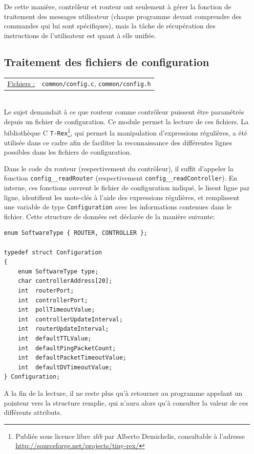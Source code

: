 \documentclass[a4paper,11pt]{article}
\begin{document}
De cette manière, contrôleur et routeur ont seulement à gérer la fonction de traitement des messages utilisateur (chaque programme devant comprendre des commandes qui lui sont spécifiques), mais la tâche de récupération des instructions de l'utilisateur est quant à elle unifiée.

\subsection{Traitement des fichiers de configuration}

\begin{tabularx}{\linewidth}{lX}
\underline{Fichiers :} & \texttt{common/config.c}, \texttt{common/config.h}\\
\end{tabularx}\\

Le sujet demandait à ce que routeur comme contrôleur puissent être paramétrés depuis un fichier de configuration. Ce module permet la lecture de ces fichiers. La bibliothèque C \texttt{T-Rex}\footnote{Publiée sous licence libre \textit{zlib} par Alberto Demichelis, consultable à l'adresse \url{http://sourceforge.net/projects/tiny-rex/}}, qui permet la manipulation d'expressions régulières, a été utilisée dans ce cadre afin de faciliter la reconnaissance des différentes lignes possibles dans les fichiers de configuration.

Dans le code du routeur (respectivement du contrôleur), il suffit d'appeler la fonction \texttt{config\_\_readRouter} (respectivement \texttt{config\_\_readController}). En interne, ces fonctions ouvrent le fichier de configuration indiqué, le lisent ligne par ligne, identifient les mots-clés à l'aide des expressions régulières, et remplissent une variable de type \texttt{Configuration} avec les informations contenues dans le fichier. Cette structure de données est déclarée de la manière suivante:

\begin{lstlisting}
enum SoftwareType { ROUTER, CONTROLLER };

typedef struct Configuration
{
	enum SoftwareType type;
	char controllerAddress[20];
	int  routerPort;
	int  controllerPort;
	int  pollTimeoutValue;
	int  controllerUpdateInterval;
	int  routerUpdateInterval;
	int  defaultTTLValue;
	int  defaultPingPacketCount;
	int  defaultPacketTimeoutValue;
	int  defaultDVTimeoutValue;
} Configuration;
\end{lstlisting}

A la fin de la lecture, il ne reste plus qu'à retourner au programme appelant un pointeur vers la structure remplie, qui n'aura alors qu'à consulter la valeur de ces différents attributs.
\end{document}
